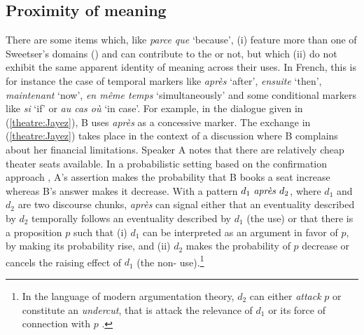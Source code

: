 \documentclass[output=paper,colorlinks,citecolor=brown]{langscibook}
\begin{document}

\subsection{Proximity of meaning}
\label{sec-meaning-proximity:Jayez}
\largerpage[-1]

There are some items which, like \textit{parce que} `because', (i) feature more than one of Sweetser's domains () and can contribute to the  or not, but which (ii) do not exhibit the same apparent identity of meaning across their uses. In French, this is for instance the case of temporal markers like \textit{après} `after', \textit{ensuite} `then', \textit{maintenant} `now', \textit{en même temps} `simultaneously' and some conditional markers like \textit{si} `if' or \textit{au cas où} `in case'. For example, in the dialogue given in (\ref{theatre:Jayez}), B uses \textit{après} as a concessive marker. The exchange in (\ref{theatre:Jayez}) takes place in the context of a discussion where B complains about her financial limitations. Speaker A notes that there are relatively cheap theater seats available. In a probabilistic setting \citep{Jayez:2024,Winterstein:2010} based on the confirmation approach \citep{CrupiandTentori:2016}, A's assertion makes the probability that B books a seat increase whereas B's answer makes it decrease. With a pattern $d_1 \mbox{ \textit{après} } d_2$, where $d_1$ and $d_2$ are two discourse chunks, \textit{après} can signal either that an eventuality described by $d_2$ temporally follows an eventuality described by $d_1$ (the  use) or that there is a proposition $p$ such that (i) $d_1$ can be interpreted as an argument in favor of $p$, by making its probability rise, and (ii) $d_2$ makes the probability of $p$ decrease or cancels the raising effect of $d_1$ (the non- use).\footnote{In the language of modern argumentation theory, $d_2$ can either \textit{attack} $p$ or constitute an \textit{undercut}, that is attack the relevance of $d_1$ or its force of connection with $p$ \citep[see for instance][]{Walton:2013}.}
\end{document}
